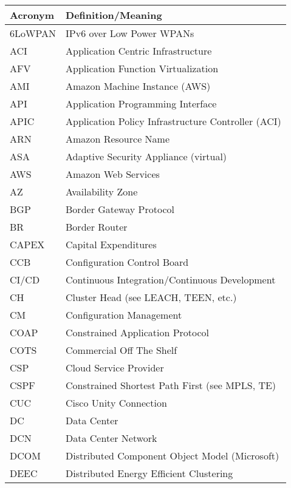 \begin{longtable}{ll}
  \toprule
  \textbf{Acronym}	&	\textbf{Definition/Meaning}		\\ \midrule
  6LoWPAN	&		IPv6 over Low Power WPANs		\\ \midrule
  ACI		&		Application Centric Infrastructure		\\ \midrule
  AFV		&		Application Function Virtualization		\\ \midrule
  AMI		&		Amazon Machine Instance (AWS)		\\ \midrule
  API		&		Application Programming Interface		\\ \midrule
  APIC		&		Application Policy Infrastructure Controller (ACI)		\\ \midrule
  ARN		&		Amazon Resource Name		\\ \midrule
  ASA		&		Adaptive Security Appliance (virtual)		\\ \midrule
  AWS		&		Amazon Web Services		\\ \midrule
  AZ		&		Availability Zone		\\ \midrule
  BGP		&		Border Gateway Protocol		\\ \midrule
  BR		&		Border Router		\\ \midrule
  CAPEX		&		Capital Expenditures		\\ \midrule
  CCB		&		Configuration Control Board		\\ \midrule
  CI/CD		&		Continuous Integration/Continuous Development		\\ \midrule
  CH		&		Cluster Head (see LEACH, TEEN, etc.)		\\ \midrule
  CM		&		Configuration Management		\\ \midrule
  COAP		&		Constrained Application Protocol		\\ \midrule
  COTS		&		Commercial Off The Shelf		\\ \midrule
  CSP		&		Cloud Service Provider		\\ \midrule
  CSPF		&		Constrained Shortest Path First (see MPLS, TE)		\\ \midrule
  CUC		&		Cisco Unity Connection		\\ \midrule
  DC		&		Data Center		\\ \midrule
  DCN		&		Data Center Network		\\ \midrule
  DCOM		&		Distributed Component Object Model (Microsoft)		\\ \midrule
  DEEC		&		Distributed Energy Efficient Clustering		\\ \midrule

\end{longtable}

